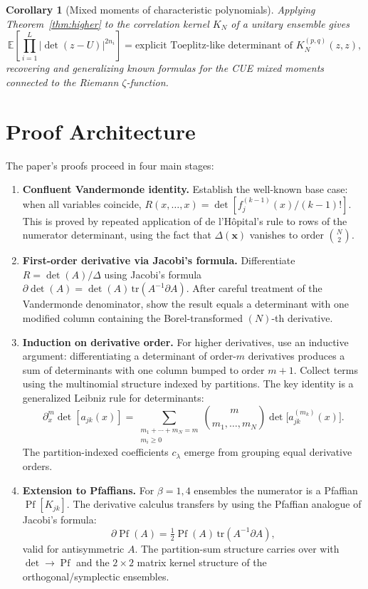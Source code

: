 \documentclass[11pt,a4paper]{article}
\newtheorem{corollary}[theorem]{Corollary}
\theoremstyle{definition}
\begin{document}
\begin{corollary}[Mixed moments of characteristic polynomials]
Applying Theorem~\ref{thm:higher} to the correlation kernel $K_N$ of a unitary ensemble gives
\[
  \mathbb{E}\!\left[\prod_{i=1}^{L}|\det(z-U)|^{2n_i}\right]
  = \text{explicit Toeplitz-like determinant of } K_N^{(p,q)}(z,z),
\]
recovering and generalizing known formulas for the CUE mixed moments connected to the Riemann $\zeta$-function.
\end{corollary}

\section{Proof Architecture}

The paper's proofs proceed in four main stages:

\begin{enumerate}[label=\textbf{Step \arabic*:}, leftmargin=2.5em]
  \item \textbf{Confluent Vandermonde identity.}
  Establish the well-known base case: when all variables coincide, $R(x,\dots,x) = \det[f_j^{(k-1)}(x)/(k-1)!]$.  This is proved by repeated application of de l'H\^opital's rule to rows of the numerator determinant, using the fact that $\Delta(\mathbf{x})$ vanishes to order $\binom{N}{2}$.

  \item \textbf{First-order derivative via Jacobi's formula.}
  Differentiate $R = \det(A)/\Delta$ using Jacobi's formula $\partial\det(A) = \det(A)\,\mathrm{tr}(A^{-1}\partial A)$.  After careful treatment of the Vandermonde denominator, show the result equals a determinant with one modified column containing the Borel-transformed $(N)$-th derivative.

  \item \textbf{Induction on derivative order.}
  For higher derivatives, use an inductive argument: differentiating a determinant of order-$m$ derivatives produces a sum of determinants with one column bumped to order $m+1$.  Collect terms using the multinomial structure indexed by partitions.  The key identity is a generalized Leibniz rule for determinants:
  \[
    \partial_x^m \det[a_{jk}(x)] = \sum_{\substack{m_1+\cdots+m_N=m \\ m_i\geq 0}} \binom{m}{m_1,\dots,m_N} \det\!\bigl[a_{jk}^{(m_k)}(x)\bigr].
  \]
  The partition-indexed coefficients $c_\lambda$ emerge from grouping equal derivative orders.

  \item \textbf{Extension to Pfaffians.}
  For $\beta=1,4$ ensembles the numerator is a Pfaffian $\operatorname{Pf}[K_{jk}]$.  The derivative calculus transfers by using the Pfaffian analogue of Jacobi's formula:
  \[
    \partial \operatorname{Pf}(A) = \tfrac{1}{2}\operatorname{Pf}(A)\,\mathrm{tr}(A^{-1}\partial A),
  \]
  valid for antisymmetric $A$.  The partition-sum structure carries over with $\det\to\operatorname{Pf}$ and the $2\times2$ matrix kernel structure of the orthogonal/symplectic ensembles.
\end{enumerate}
\end{document}
